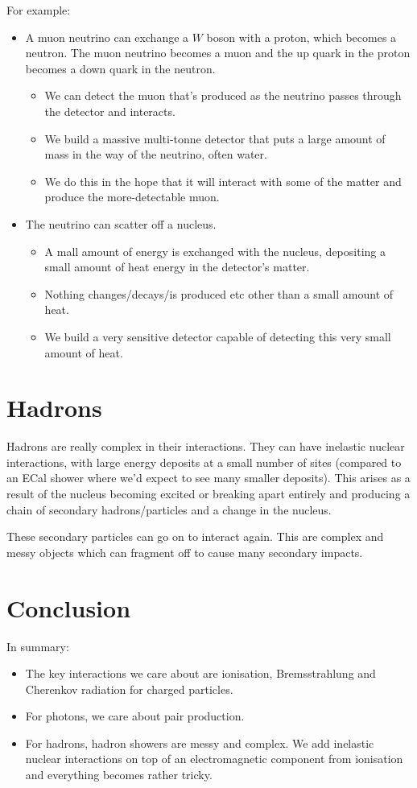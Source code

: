 For example:
\begin{itemize}
    \item A muon neutrino can exchange a $W$ boson with a proton, which becomes a neutron. The muon neutrino becomes a muon and the up quark in the proton becomes a down quark in the neutron.
    \begin{itemize}
        \item We can detect the muon that's produced as the neutrino passes through the detector and interacts.
        \item We build a massive multi-tonne detector that puts a large amount of mass in the way of the neutrino, often water. 
        \item We do this in the hope that it will interact with some of the matter and produce the more-detectable muon.
    \end{itemize}
    \item The neutrino can scatter off a nucleus. 
    \begin{itemize}
        \item A mall amount of energy is exchanged with the nucleus, depositing a small amount of heat energy in the detector's matter.
        \item Nothing changes/decays/is produced etc other than a small amount of heat.
        \item We build a very sensitive detector capable of detecting this very small amount of heat.
    \end{itemize}
\end{itemize}

\section{Hadrons}
Hadrons are really complex in their interactions. They can have inelastic nuclear interactions, with large energy deposits at a small number of sites (compared to an ECal shower where we'd expect to see many smaller deposits). This arises as a result of the nucleus becoming excited or breaking apart entirely and producing a chain of secondary hadrons/particles and a change in the nucleus. 

These secondary particles can go on to interact again. This are complex and messy objects which can fragment off to cause many secondary impacts.

\section{Conclusion}
In summary:
\begin{itemize}
    \item The key interactions we care about are ionisation, Bremsstrahlung and Cherenkov radiation for charged particles.
    \item For photons, we care about pair production.
    \item For hadrons, hadron showers are messy and complex. We add inelastic nuclear interactions on top of an electromagnetic component from ionisation and everything becomes rather tricky.
\end{itemize}

